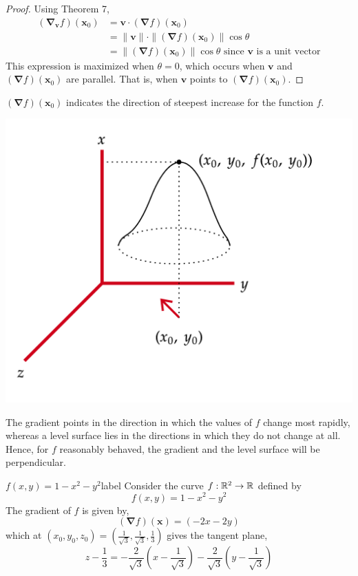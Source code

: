 \begin{proof}
    Using Theorem 7,
    \begin{align*}
        \left(\mathbf{\nabla}_{\mathbf{v}} f\right)\left(\mathbf{x}_0\right)
        &= \mathbf{v} \cdot (\mathbf{\nabla} f)\left(\mathbf{x}_0\right) \\
        &= \|\mathbf{v}\| \cdot \|(\mathbf{\nabla} f)\left(\mathbf{x}_0\right)\| \cos\theta \\
        &= \|(\mathbf{\nabla} f)\left(\mathbf{x}_0\right)\| \cos\theta \text{ since } \mathbf{v} \text{ is a unit vector}
    \end{align*}
    This expression is maximized when $\theta = 0$, which occurs when $\mathbf{v}$ and $(\mathbf{\nabla} f)\left(\mathbf{x}_0\right)$ are parallel. That is, when $\mathbf{v}$ points to $(\mathbf{\nabla} f)\left(\mathbf{x}_0\right)$.
\end{proof}

\begin{marginfigure}
    $(\mathbf{\nabla} f)\left(\mathbf{x}_0\right)$ indicates the direction of steepest increase for the function $f$.
    \begin{center}
    \includegraphics[width=\textwidth]{figures/wk-3/fig-30.png}
\end{center}
\end{marginfigure}

\begin{rmk}
    The gradient points in the direction in which the values of $f$ change most rapidly, whereas a level surface lies in the directions in which they do not change at all. Hence, for $f$ reasonably behaved, the gradient and the level surface will be perpendicular.
\end{rmk}

\begin{ex}{$f(x, y)=1-x^2-y^2$}{label}
    Consider the curve $f: \mathbb{R}^2 \rightarrow \mathbb{R}$ defined by
    \[f(x, y)=1-x^2-y^2\]
    The gradient of $f$ is given by,
    \[(\mathbf{\nabla} f)(\mathbf{x})=\left(-2 x -2 y\right)\]
    which at $(x_0, y_0, z_0) = \left(\frac{1}{\sqrt{3}}, \frac{1}{\sqrt{3}}, \frac{1}{3}\right)$ gives the tangent plane,
    \[z-\frac{1}{3} = -\frac{2}{\sqrt{3}}(x - \frac{1}{\sqrt{3}}) - \frac{2}{\sqrt{3}}(y-\frac{1}{\sqrt{3}})\]
\end{ex}